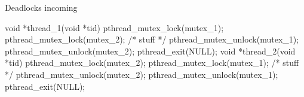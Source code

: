 \documentclass[10pt,graphics,aspectratio=169,table]{beamer}
\begin{document}
\begin{frame}[fragile]{Deadlocks incoming}
     \begin{codeblock}
void *thread_1(void *tid) {
    pthread_mutex_lock(mutex_1);
    pthread_mutex_lock(mutex_2);
    /* stuff */
    pthread_mutex_unlock(mutex_1);
    pthread_mutex_unlock(mutex_2);
    pthread_exit(NULL);
}
void *thread_2(void *tid) {
    pthread_mutex_lock(mutex_2);
    pthread_mutex_lock(mutex_1);
    /* stuff */
    pthread_mutex_unlock(mutex_2);
    pthread_mutex_unlock(mutex_1);
    pthread_exit(NULL);
}
    \end{codeblock}
\end{frame}
\end{document}
